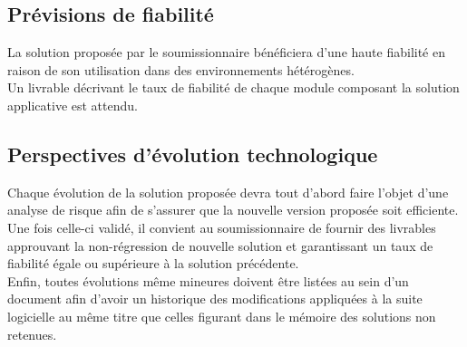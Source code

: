 \subsection{Prévisions de fiabilité}
La solution proposée par le soumissionnaire bénéficiera d'une haute fiabilité en raison de son utilisation dans des environnements hétérogènes.
\\
Un livrable décrivant le taux de fiabilité de chaque module composant la solution applicative est attendu.

\subsection{Perspectives d'évolution technologique}
Chaque évolution de la solution proposée devra tout d'abord faire l'objet d'une analyse de risque afin de s'assurer que la nouvelle version proposée soit efficiente.
\\
Une fois celle-ci validé, il convient au soumissionnaire de fournir des livrables approuvant la non-régression de nouvelle solution et garantissant un taux de fiabilité égale ou supérieure à la solution précédente.
\\
Enfin, toutes évolutions même mineures doivent être listées au sein d'un document afin d'avoir un historique des modifications appliquées à la suite logicielle au même titre que celles figurant dans le mémoire des solutions non retenues.

